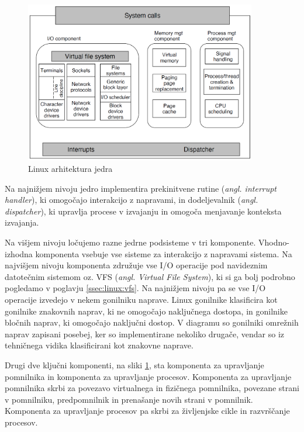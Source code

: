 \documentclass[a4paper,12pt,openright]{book}
\begin{document}
\begin{figure}[h!]
	\begin{center}
		\includegraphics[width=0.9\textwidth]{images/linux_kernel_structure.png}
	\end{center}
	\caption{Linux arhitektura jedra \cite{Tanenbaum_Bos_2023}}
	\label{fig:linux_kernel_architecture}
\end{figure}

Na najnižjem nivoju jedro implementira prekinitvene rutine (\textit{angl. interrupt handler}), ki omogočajo interakcijo z napravami, 
in dodeljevalnik (\textit{angl. dispatcher}), ki upravlja procese v izvajanju in omogoča menjavanje konteksta izvajanja.

Na višjem nivoju ločujemo razne jedrne podsisteme v tri komponente.
Vhodno-izhodna komponenta vsebuje vse sisteme za interakcijo z napravami sistema.
Na najvišjem nivoju komponenta združuje vse I/O operacije pod navideznim datotečnim sistemom oz. VFS (\textit{angl. Virtual File System}), ki si ga bolj podrobno pogledamo v poglavju \ref{ssec:linux:vfs}.
Na najnižjem nivoju pa se vse I/O operacije izvedejo v nekem gonilniku naprave.
Linux gonilnike klasificira kot gonilnike znakovnih naprav, ki ne omogočajo naključnega dostopa, in gonilnike bločnih naprav, ki omogočajo naključni dostop.
V diagramu so gonilniki omrežnih naprav zapisani posebej, ker so implementirane nekoliko drugače, vendar so iz tehničnega vidika klasificirani kot znakovne naprave.

Drugi dve ključni komponenti, na sliki \ref{fig:linux_kernel_architecture}, sta komponenta za upravljanje pomnilnika in komponenta za upravljanje procesov.
Komponenta za upravljanje pomnilnika skrbi za povezavo virtualnega in fizičnega pomnilnika, povezane strani v pomnilniku, predpomnilnik in prenašanje novih strani v pomnilnik.
Komponenta za upravljanje procesov pa skrbi za življenjske cikle in razvrščanje procesov.
\cite{Tanenbaum_Bos_2023}
\end{document}
